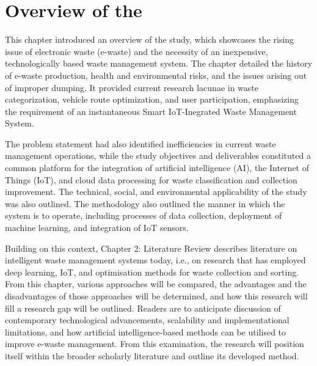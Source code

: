 \fi


\section{Overview of the \documentType}

This chapter introduced an overview of the study, which showcases the rising issue of electronic waste (e-waste) and the necessity of an inexpensive, technologically based waste management system. The chapter detailed the history of e-waste production, health and environmental risks, and the issues arising out of improper dumping. It provided current research lacunae in waste categorization, vehicle route optimization, and user participation, emphasizing the requirement of an instantaneous Smart IoT-Inegrated Waste Management System.

The problem statement had also identified inefficiencies in current waste management operations, while the study objectives and deliverables constituted a common platform for the integration of artificial intelligence (AI), the Internet of Things (IoT), and cloud data processing for waste classification and collection improvement. The technical, social, and environmental applicability of the study was also outlined. The methodology also outlined the manner in which the system is to operate, including processes of data collection, deployment of machine learning, and integration of IoT sensors. 

Building on this context, Chapter 2: Literature Review describes literature on intelligent waste management systems today, i.e., on research that has employed deep learning, IoT, and optimisation methods for waste collection and sorting. From this chapter, various approaches will be compared, the advantages and the disadvantages of those approaches will be determined, and how this research will fill a research gap will be outlined. Readers are to anticipate discussion of contemporary technological advancements, scalability and implementational limitations, and how artificial intelligence-based methods can be utilised to improve e-waste management. From this examination, the research will position itself within the broader scholarly literature and outline its developed method.

